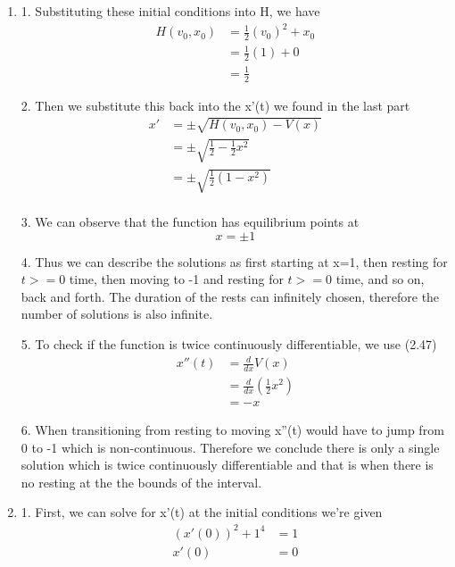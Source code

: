\documentclass[12pt]{article}
\begin{document}
\begin{enumerate}
  \item [(b)]

        1. Substituting these initial conditions into H, we have
        \begin{align*}
          H(v_0, x_0) & = \frac{1}{2}(v_0)^2+x_0 \\
                      & = \frac{1}{2}(1) + 0     \\
                      & = \frac{1}{2}
        \end{align*}

        2. Then we substitute this back into the x'(t) we found in the last part
        \begin{align*}
          x' & = \pm{} \sqrt{H(v_0, x_0) - V(x)}           \\
             & = \pm{} \sqrt{\frac{1}{2} - \frac{1}{2}x^2} \\
             & = \pm{} \sqrt{\frac{1}{2}(1-x^2)}           \\
        \end{align*}

        3. We can observe that the function has equilibrium points at
        \[
          x = \pm{1}
        \]

        4. Thus we can describe the solutions as first starting at x=1, then resting for $t>=0$ time, then moving to -1 and resting for $t>=0$ time, and so on, back and forth. The duration of the rests can infinitely chosen, therefore the number of solutions is also infinite.

        5. To check if the function is twice continuously differentiable, we use (2.47)
        \begin{align*}
          x''(t) & = \frac{d}{dx} V(x)            \\
                 & = \frac{d}{dx}(\frac{1}{2}x^2) \\
                 & = -x
        \end{align*}

        6. When transitioning from resting to moving x''(t) would have to jump from 0 to -1 which is non-continuous. Therefore we conclude there is only a single solution which is twice continuously differentiable and that is when there is no resting at the the bounds of the interval.

  \item [(c)]

        1. First, we can solve for x'(t) at the initial conditions we're given
        \begin{align*}
          (x'(0))^2 + 1^4 & = 1 \\
          x'(0)           & = 0
        \end{align*}


\end{enumerate}
\end{document}
